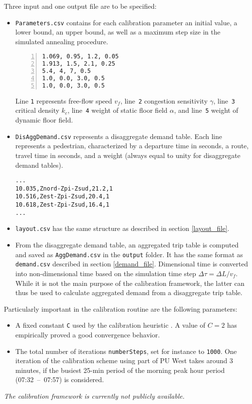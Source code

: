 \documentclass[a4paper,12pt]{article}
\begin{document}
Three input and one output file are to be specified:
\begin{itemize}
	\item \verb+Parameters.csv+ contains for each calibration parameter an initial value, a lower bound, an upper bound, as well as a maximum step size in the simulated annealing procedure.	
\begin{Verbatim}[numbers=left]
1.069, 0.95, 1.2, 0.05
1.913, 1.5, 2.1, 0.25
5.4, 4, 7, 0.5
1.0, 0.0, 3.0, 0.5
1.0, 0.0, 3.0, 0.5
\end{Verbatim}
Line \verb+1+ represents free-flow speed $v_f$, line~\verb+2+ congestion sensitivity $\gamma$, line~\verb+3+ critical density $k_c$, line~\verb+4+ weight of static floor field $\alpha$, and line~\verb+5+ weight of dynamic floor field.

	\item \verb+DisAggDemand.csv+ represents a disaggregate demand table. Each line represents a pedestrian, characterized by a departure time in seconds, a route, travel time in seconds, and a weight (always equal to unity for disaggregate demand tables).
\begin{Verbatim}
...
10.035,Znord-Zpi-Zsud,21.2,1
10.516,Zest-Zpi-Zsud,20.4,1
10.618,Zest-Zpi-Zsud,16.4,1
...
\end{Verbatim}

	\item \verb+layout.csv+ has the same structure as described in section \ref{layout_file}.

	\item From the disaggregate demand table, an aggregated trip table is computed and saved as \verb+AggDemand.csv+ in the \verb+output+ folder. It has the same format as \verb+demand.csv+ described in section \ref{demand_file}. Dimensional time is converted into non-dimensional time based on the simulation time step $\Delta \tau = \Delta L/v_f$. While it is not the main purpose of the calibration framework, the latter can thus be used to calculate aggregated demand from a disaggregate trip table.

	
\end{itemize} 

Particularly important in the calibration routine are the following parameters: 
\begin{itemize}
	\item A fixed constant \verb+C+ used by the calibration heuristic \cite{CalibPedCTM}. A value of $C=2$ has empirically proved a good convergence behavior.
	\item The total number of iterations \verb+numberSteps+, set for instance to \verb+1000+. One iteration of the calibration scheme using part of PU West takes around 3 minutes, if the busiest 25-min period of the morning peak hour period (07:32~--~07:57) is considered.
\end{itemize}

\emph{\color{red}The calibration framework is currently not publicly available.}




\end{document}
